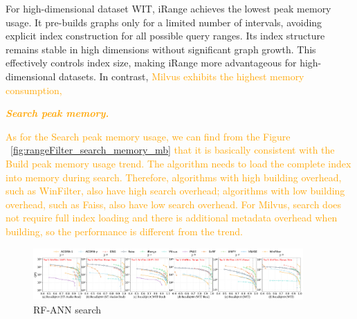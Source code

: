 \documentclass[sigconf, nonacm]{acmart}
\begin{document}
	For high-dimensional dataset WIT, iRange achieves the lowest peak memory usage. It pre-builds graphs only for a limited number of intervals, avoiding explicit index construction for all possible query ranges. Its index structure remains stable in high dimensions without significant graph growth. This effectively controls index size, making iRange more advantageous for high-dimensional datasets.
	In contrast, \textcolor{orange}{Milvus exhibits the highest memory consumption,}
	
		\textit{\textbf{\textcolor{orange}{Search peak memory.}}}
		
		
		\textcolor{orange}{As for the Search peak memory usage, we can find from the Figure ~\ref{fig:rangeFilter_search_memory_mb} that it is basically consistent with the Build peak memory usage trend. The algorithm needs to load the complete index into memory during search. Therefore, algorithms with high building overhead, such as WinFilter, also have high search overhead; algorithms with low building overhead, such as Faiss, also have low search overhead. For Milvus, search does not require full index loading and there is additional metadata overhead when building, so the performance is different from the trend.}
		
	\begin{figure}[t]
		
		\centering
		
		\includegraphics[width=0.92\textwidth]{figures/exp/exp_8_2.pdf}
		\caption{RF-ANN search }
		\label{fig:exp_8_2}
	\end{figure}
	
\end{document}
